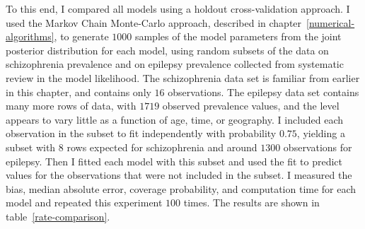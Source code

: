 To this end, I compared all models using a holdout cross-validation
approach.  I used the Markov Chain Monte-Carlo approach, described in
chapter~\ref{numerical-algorithms}, to generate $1000$ samples of the
model parameters from the joint posterior distribution for each model,
using random subsets of the data on schizophrenia prevalence and on epilepsy prevalence collected from
systematic review\cite{vos_years_2012}
 in the model likelihood.  The schizophrenia data set is familiar from earlier in this chapter, and contains only $16$ observations. The epilepsy data set
contains many more rows of data, with $1719$ observed prevalence values, and the level appears to vary
little as a function of age, time, or geography.  I included each
observation in the subset to fit independently with probability $0.75$,
yielding a subset with $8$ rows expected for schizophrenia and around $1300$ observations for epilepsy. Then I fitted each
model with this subset and used the fit to predict values for the
observations that were not included in the subset.  I measured the
bias, median absolute error, coverage probability, and computation
time for each model and repeated this experiment $100$ times.  The
results are shown in table~\ref{rate-comparison}.

